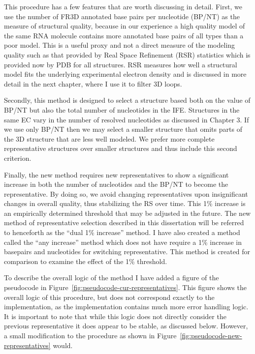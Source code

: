 This procedure has a few features that are worth discussing in detail. First, we
use the number of FR3D annotated base pairs per nucleotide (BP/NT) as the
measure of structural quality, because in our experience a high quality model of
the same RNA molecule contains more annotated base pairs of all types than a
poor model. This is a useful proxy and not a direct measure of the modeling
quality such as that provided by Real Space Refinement (RSR) statistics which is
provided now by PDB for all structures. RSR measures how well a structural model
fits the underlying experimental electron density and is discussed in more
detail in the next chapter, where I use it to filter 3D loops.

Secondly, this method is designed to select a structure based both on the value
of BP/NT but also the total number of nucleotides in the IFE\@. Structures in the
same EC vary in the number of resolved nucleotides as discussed in Chapter 3. If
we use only BP/NT then we may select a  smaller structure that omits parts of
the 3D structure that are less well modeled. We prefer more complete
representative structures over smaller structures and thus include this second
criterion.

Finally, the new method requires new representatives to show a significant
increase in both the number of nucleotides and the BP/NT to become the
representative. By doing so, we avoid changing representatives upon
insignificant changes in overall quality, thus stabilizing the RS over time.
This 1\% increase is an empirically determined threshold that may be adjusted in
the future. The new method of representative selection described in this
dissertation will be referred to henceforth as the ``dual 1\% increase'' method.
I have also created a method called the ``any increase'' method which does not
have require a 1\% increase in basepairs and nucleotides for switching
representative. This method is created for comparison to examine the effect of
the 1\% threshold.

To describe the overall logic of the method I have added a figure of the
pseudocode in Figure~\ref{fig:pseudocode-cur-representatives}. This figure shows
the overall logic of this procedure, but does not correspond exactly to the
implementation, as the implementation contains much more error handling logic.
It is important to note that while this logic does not directly consider the
previous representative it does appear to be stable, as discussed below.
However, a small modification to the procedure as shown in
Figure~\ref{fig:pseudocode-new-representatives} would.

